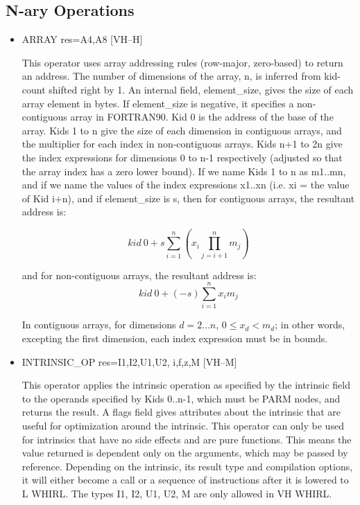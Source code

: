 \subsection{N-ary Operations}

\begin{itemize}
\item
{}%
ARRAY res=A4,A8 \hfill [VH--H]

This operator uses array addressing rules (row-major, zero-based) to
return an address.
The number of dimensions of the array, n, is inferred from kid-count
shifted right
by 1. An internal field, element\_size, gives the size of
each array element in bytes. If element\_size is negative, it specifies
a non-contiguous array in FORTRAN90. Kid 0 is the address of the
base of the array. Kids 1 to n give the size of each dimension in
contiguous arrays, and the multiplier for each index in non-contiguous
arrays. Kids n+1 to 2n give the index expressions for dimensions 0
to n-1 respectively (adjusted so that the array index has a zero
lower bound). If we name Kids 1 to n as m1..mn, and if we name the
values of the index expressions x1..xn (i.e. xi = the value of Kid
i+n), and if element\_size is s, then for contiguous arrays, the
resultant address is:

\begin{displaymath}
kid~0 + s \sum^n_{i=1} \left( x_i \prod^n_{j=i+1} m_j\right)
\end{displaymath}

and for non-contiguous arrays, the resultant address is: 
\begin{displaymath}
kid~0 + (-s) \sum^n_{i=1} x_i  m_j
\end{displaymath}

In contiguous arrays, for dimensions $d=2\ldots n$, $0 \leq x_d < m_d$; 
in other words, excepting
the first dimension, each index expression must be in bounds. 

\item
{}%
INTRINSIC\_OP res=I1,I2,U1,U2, i,f,z,M  \hfill [VH--M]

This operator applies the intrinsic operation as specified by the
intrinsic field to the operands specified by Kids 0..n-1, which must
be
%
PARM nodes, and returns the result. A flags field gives attributes
about the intrinsic that are useful for optimization around the
intrinsic. This operator can only be used for intrinsics that have
no side effects and are pure functions. This means the value returned
is dependent only on the arguments, which may be passed by reference.
Depending on the intrinsic, its result type and compilation options,
it will either become a call or a sequence of instructions after it
is lowered to L WHIRL. The types I1, I2, U1, U2, M are only allowed
in VH WHIRL. 


\end{itemize}

